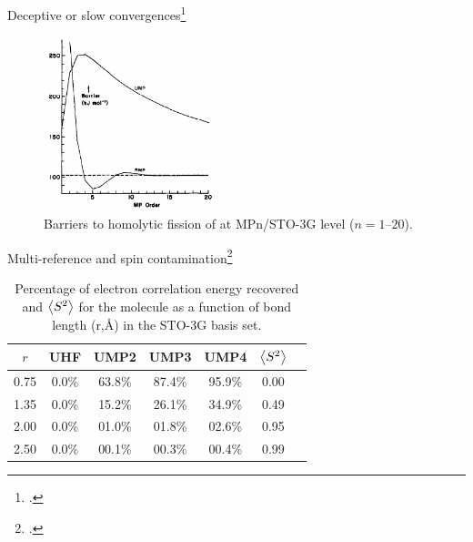 \documentclass[xcolor=x11names,compress]{beamer}
\renewcommand{\(}{\begin{columns}}
\renewcommand{\)}{\end{columns}}
\newcommand{\<}[1]{\begin{column}{#1}}
\renewcommand{\>}{\end{column}}
\begin{document}
\begin{frame}{Deceptive or slow convergences\footcite{gill_deceptive_1986}}

\begin{figure}
    \centering
    \includegraphics[width=0.45\textwidth]{gill1986.png}
    \caption{\centering Barriers to homolytic fission of  at MPn/STO-3G level ($n = 1$--$20$).}
    \label{fig:my_label}
\end{figure}

    
\end{frame}

\begin{frame}{Multi-reference and spin contamination\footcite{gill_why_1988}}
\begin{table}
    \centering
    \begin{tabular}{c c c c c c c}
\hline
 $r$ & UHF & UMP2 & UMP3 & UMP4 & $\expval{S^2}$ \\
\hline
0.75 & 0.0\% & 63.8\% & 87.4\% & 95.9\% & 0.00\\
1.35 & 0.0\% & 15.2\% & 26.1\% & 34.9\% & 0.49\\
2.00 & 0.0\% & 01.0\% & 01.8\% & 02.6\% & 0.95\\
2.50 & 0.0\% & 00.1\% & 00.3\% & 00.4\% & 0.99\\
\hline
\end{tabular}
    \caption{\centering Percentage of electron correlation energy recovered and $\expval{S^2}$ for the  molecule as a function of bond length (r,\si{\angstrom}) in the STO-3G basis set.}
    \label{tab:my_label}
\end{table}
    
\end{frame}
\end{document}

